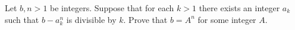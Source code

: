 Let $b, n > 1$ be integers. Suppose that for each $k > 1$ there exists an integer $a_k$ such that $b - a_k^n$ is divisible by $k$. Prove that $b = A^n$ for some integer $A$.

